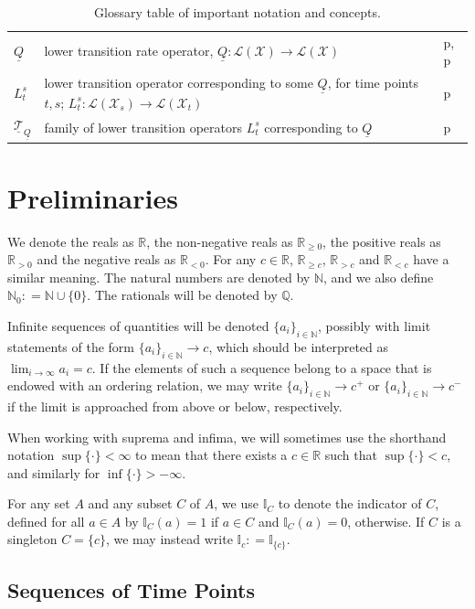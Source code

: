 \documentclass[10pt,a4paper]{paper}
\theoremstyle{definition}
\newcommand{\nats}{\mathbb{N}}
\newcommand{\reals}{\mathbb{R}}
\newcommand{\realspos}{\reals_{>0}}
\newcommand{\realsnonneg}{\reals_{\geq 0}}
\newcommand{\states}{\mathcal{X}}
\newcommand{\gambles}{\mathcal{L}}
\newcommand{\gamblesX}{\gambles(\states)}
\newcommand{\ind}[1]{\mathbb{I}_{#1}}
\newcommand{\lrate}{\underline{Q}}
\newcommand{\coloneqq}{:\!=}
\newcommand{\placeref}[1]{p\pageref{#1}}
\begin{document}
\begin{table}[htb]
\begin{tabularx}{\textwidth}{l|X|l}
$\lrate$ & lower transition rate operator, $\lrate: \gamblesX\to\gamblesX$ & \placeref{def:coh_low_trans_rate}, \placeref{eq:correspondinglowertrans}\\
$L_t^s$ & lower transition operator corresponding to some $\lrate$, for time points $t,s$; $L_t^s:\gambles(\states_s)\to\gambles(\states_t)$ & \placeref{def:low_trans} \\
$\underline{\mathcal{T}}_{\lrate}$ & family of lower transition operators $L_t^s$ corresponding to $\lrate$ & \placeref{def:low_trans_system}
\end{tabularx}
\caption{Glossary table of important notation and concepts.}\label{table:glossary}
\end{table}

\section{Preliminaries}\label{sec:prelim}

We denote the reals as $\reals$, the non-negative reals as $\realsnonneg$, the positive reals as $\realspos$ and the negative reals as $\reals_{<0}$. For any $c\in\reals$, $\reals_{\geq c}$, $\reals_{>c}$ and $\reals_{<c}$ have a similar meaning. The natural numbers are denoted by $\nats$, and we also define $\nats_0\coloneqq\nats\cup\{0\}$. The rationals will be denoted by $\mathbb{Q}$.

Infinite sequences of quantities will be denoted $\{a_i\}_{i\in\nats}$, possibly with limit statements of the form $\{a_i\}_{i\in\nats}\to c$, which should be interpreted as $\lim_{i\to\infty}a_i=c$. If the elements of such a sequence belong to a space that is endowed with an ordering relation, we may write $\{a_i\}_{i\in\nats}\to c^+$ or $\{a_i\}_{i\in\nats}\to c^-$ if the limit is approached from above or below, respectively.

When working with suprema and infima, we will sometimes use the shorthand notation $\sup\{\cdot\}<\infty$ to mean that there exists a $c\in\reals$ such that $\sup\{\cdot\}< c$, and similarly for $\inf\{\cdot\}>-\infty$.

For any set $A$ and any subset $C$ of $A$, we use $\ind{C}$ to denote the indicator of $C$, defined for all $a\in A$ by $\ind{C}(a)=1$ if $a\in C$ and $\ind{C}(a)=0$, otherwise. If $C$ is a singleton $C=\{c\}$, we may instead write $\ind{c}\coloneqq\ind{\{c\}}$.

\subsection{Sequences of Time Points}\label{subsec:sequencesoftimepoints}
\end{document}
